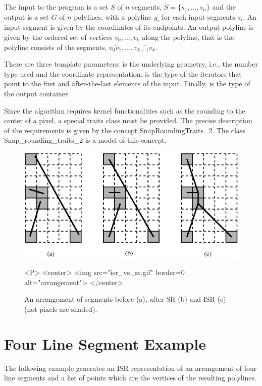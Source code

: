 The input to the program is a set $S$ of $n$ segments,
$S=\{s_1,\ldots,s_n\}$ and the output is a set $G$ of $n$ polylines,
with a polyline $g_i$ for each input segments $s_i$. An input segment
is given by the coordinates of its endpoints. An output polyline is
given by the ordered set of vertices $v_0,\ldots,v_k$ along the polyline,
that is the polyline consists of the segments,
$\bar{v_0v_1},\ldots,\bar{v_{k-1}v_k}$.

There are three template parameters:  is the underlying geometry, i.e., the number type used
and the coordinate representation.  is the type of the iterators that point to the first
and after-the-last elements of the input. Finally,  is the type of the output container.

Since the algorithm requires kernel functionalities such as the rounding to the center of a pixel, a special
traits class must be provided. The precise description of the requirements is given by the
concept SnapRoundingTraits\_2. The class Snap\_rounding\_traits\_2 is a model of this concept.

\begin{figure}
\begin{ccTexOnly}
\centerline{\includegraphics{Snap_rounding_2/isr_vs_sr.ps}}
\end{ccTexOnly}

\caption{An arrangement of segments before (a), after SR (b)
and ISR (c) (hot pixels are shaded).}
\label{fig:isr_vs_sr}

\begin{ccHtmlOnly}
<P>
<center>
  <img src="isr_vs_sr.gif"  border=0 alt="arrangement">
</center>
\end{ccHtmlOnly}
\end{figure}


\section{Four Line Segment Example}

The following example generates an ISR representation
of an arrangement of four line segments
and a list of points which are the vertices of the resulting polylines.


